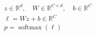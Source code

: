 \documentclass[border=7pt]{standalone}
\begin{document}
\color{ink}
$\displaystyle \begin{gathered}
z\in\mathbb R^d,\quad W\in\mathbb R^{C\times d},\quad b\in\mathbb R^C\\
\ell=Wz+b\in\mathbb R^C\\
p=\operatorname{softmax}(\ell)
\end{gathered}$
\end{document}
